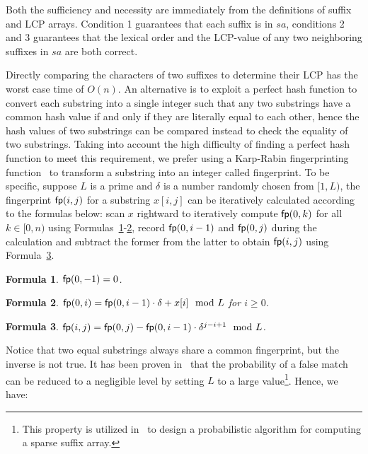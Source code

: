 \documentclass[10pt,journal,compsoc]{IEEEtran}
\newtheorem{Formula}{Formula}
\begin{document}
\begin{IEEEproof}
	Both the sufficiency and necessity are immediately from the definitions of suffix and LCP arrays. Condition 1 guarantees that each suffix is in $sa$, conditions 2 and 3 guarantees that the lexical order and the LCP-value of any two neighboring suffixes in $sa$ are both correct.
\end{IEEEproof}

Directly comparing the characters of two suffixes to determine their LCP has the worst case time of $O(n)$. An alternative is to exploit a perfect hash function to convert each substring into a single integer such that any two substrings have a common hash value if and only if they are literally equal to each other, hence the hash values of two substrings can be compared instead to check the equality of two substrings. Taking into account the high difficulty of finding a perfect hash function to meet this requirement, we prefer using a Karp-Rabin fingerprinting function~\cite{Karp1987} to transform a substring into an integer called fingerprint. To be specific, suppose $L$ is a prime and $\delta$ is a number randomly chosen from $[1, L)$, the fingerprint ${\sf fp}(i, j)$ for a substring $x[i, j]$ can be iteratively calculated according to the formulas below: scan $x$ rightward to iteratively compute ${\sf fp}(0, k)$ for all $k \in [0, n)$ using Formulas~\ref{formula:1}-\ref{formula:2}, record ${\sf fp}(0, i - 1)$ and ${\sf fp}(0, j)$ during the calculation and subtract the former from the latter to obtain ${\sf fp}(i, j)$ using Formula~\ref{formula:3}.


\begin{Formula} \label{formula:1}
	${\sf fp}(0, -1) = 0$.
	
\end{Formula}

\begin{Formula} \label{formula:2}	
	${\sf fp}(0, i) = {\sf fp}(0, i - 1) \cdot {\delta} + x[i]\mod L$ for $i \ge 0$.
	
\end{Formula}

\begin{Formula} \label{formula:3}
	${\sf fp}(i, j) = {\sf fp}(0, j) - {\sf fp}(0 ,i - 1) \cdot {\delta}^{j - i + 1}\mod L$.
	
\end{Formula}


Notice that two equal substrings always share a common fingerprint, but the inverse is not true. It has been proven in~\cite{Karp1987} that the probability of a false match can be reduced to a negligible level by setting $L$ to a large value\footnote{This property is utilized in~\cite{Bille2013} to design a probabilistic algorithm for computing a sparse suffix array.}. Hence, we have:
\end{document}
